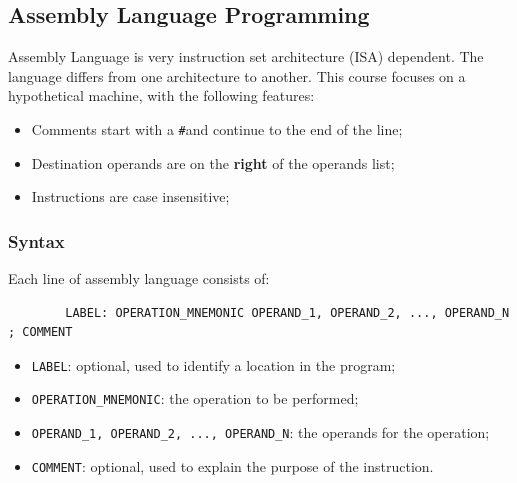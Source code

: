 \subsection{Assembly Language Programming}

\begin{remark}

Assembly Language is very instruction set architecture (ISA) dependent. The language
differs from one architecture to another. This course focuses on a hypothetical
machine, with the following features:
\begin{itemize}
    \item Comments start with a \texttt{\#}\footnotemark and continue to the end of the line;
    \item Destination operands are on the \textbf{right} of the operands list;
    \item Instructions are case insensitive;
\end{itemize}

\end{remark}


\subsubsection{Syntax}

\begin{definition}
    Each line of assembly language consists of:
    \begin{verbatim}
        LABEL: OPERATION_MNEMONIC OPERAND_1, OPERAND_2, ..., OPERAND_N ; COMMENT
    \end{verbatim}
    \begin{itemize}
        \item \texttt{LABEL}: optional, used to identify a location in the program;
        \item \texttt{OPERATION\_MNEMONIC}: the operation to be performed;
        \item \texttt{OPERAND\_1, OPERAND\_2, ..., OPERAND\_N}: the operands for the operation;
        \item \texttt{COMMENT}: optional, used to explain the purpose of the instruction.
    \end{itemize}
\end{definition}

